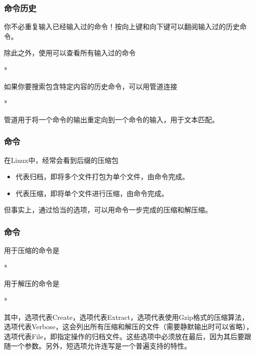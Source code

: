 \begin{frame}
    \frametitle{命令历史}
    你不必重复输入已经输入过的命令！按向上键和向下键可以翻阅输入过的历史命令。

    除此之外，使用可以查看所有输入过的命令
    \begin{Code}*
        
    \end{Code}

    如果你要搜索包含特定内容的历史命令，可以用管道\code{|}连接
    \begin{Code}*
        
    \end{Code}

    管道\code{|}用于将一个命令的输出重定向到一个命令的输入，用于文本匹配。
\end{frame}

\begin{frame}
    \frametitle{命令}
    在Linux中，经常会看到后缀的压缩包
    \begin{itemize}
        \item {}代表归档，即将多个文件打包为单个文件，由命令完成。
        \item {}代表压缩，即将单个文件进行压缩，由命令完成。
    \end{itemize}
    但事实上，通过恰当的选项，可以用命令一步完成的压缩和解压缩。
\end{frame}

\begin{frame}
    \frametitle{命令}
    用于压缩的命令是
    \begin{Code}*
        
    \end{Code}
    用于解压的命令是
    \begin{Code}*
        
    \end{Code}
    其中，选项代表Create，选项代表Extract，选项代表使用Gzip格式的压缩算法，选项代表Verbose，这会列出所有压缩和解压的文件（需要静默输出时可以省略），选项代表File，即指定操作的归档文件。这些选项中必须放在最后，因为其后要跟随一个参数。另外，短选项允许连写是一个普遍支持的特性。
\end{frame}